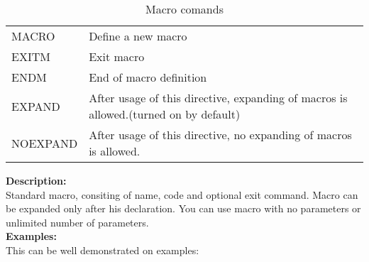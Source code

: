         \begin{table}[h!]
            \begin{tabular}{|ll|}
                    \hline
                    MACRO      & Define a new macro \\
                    EXITM      & Exit macro  \\
                    ENDM       & End of macro definition \\
                    EXPAND     & After usage of this directive, expanding of macros is allowed.(turned on by default)\\
                    NOEXPAND   & After usage of this directive, no expanding of macros is allowed.\\
                    \hline
            \end{tabular}
            \caption{Macro comands}
        \end{table}
        \textbf{Description:}\\
        Standard macro, consiting of name, code and optional exit command. Macro can be expanded only after his declaration. You can use macro
        with no parameters  or unlimited number of parameters.\\
        \textbf{Examples:}\\
        This can be well demonstrated on examples:
